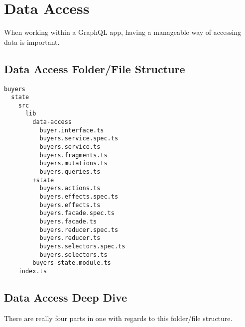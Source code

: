 \maketitle{}
\section{ Data Access }
When working within a GraphQL app, having a manageable way of accessing data
is important.

\subsection{ Data Access Folder/File Structure}
\begin{verbatim}
buyers
  state
    src
      lib
        data-access
          buyer.interface.ts
          buyers.service.spec.ts
          buyers.service.ts
          buyers.fragments.ts
          buyers.mutations.ts
          buyers.queries.ts
        +state
          buyers.actions.ts
          buyers.effects.spec.ts
          buyers.effects.ts
          buyers.facade.spec.ts
          buyers.facade.ts
          buyers.reducer.spec.ts
          buyers.reducer.ts
          buyers.selectors.spec.ts
          buyers.selectors.ts
        buyers-state.module.ts
    index.ts
\end{verbatim}
\subsection{ Data Access Deep Dive}
There are really four parts in one with regards to this folder/file structure. 
